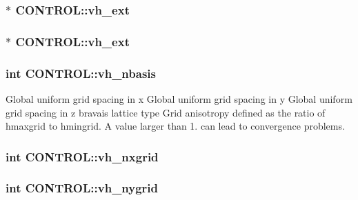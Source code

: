 \hypertarget{struct_c_o_n_t_r_o_l_a5b7c1f58a040c4d04103c8169757b896}{
\subsubsection[{vh\-\_\-ext}]{ $\ast$ C\-O\-N\-T\-R\-O\-L\-::vh\-\_\-ext}}\label{struct_c_o_n_t_r_o_l_a5b7c1f58a040c4d04103c8169757b896}
\hypertarget{struct_c_o_n_t_r_o_l_aba2213397b38451c01fe8e0325ebecb1}{
\subsubsection[{vh\-\_\-ext}]{$\ast$ C\-O\-N\-T\-R\-O\-L\-::vh\-\_\-ext}}\label{struct_c_o_n_t_r_o_l_aba2213397b38451c01fe8e0325ebecb1}
\hypertarget{struct_c_o_n_t_r_o_l_a3f8de26c496463e31095dc178aa7e8ab}{
\subsubsection[{vh\-\_\-nbasis}]{\setlength{\rightskip}{0pt plus 5cm}int C\-O\-N\-T\-R\-O\-L\-::vh\-\_\-nbasis}}\label{struct_c_o_n_t_r_o_l_a3f8de26c496463e31095dc178aa7e8ab}
Global uniform grid spacing in x Global uniform grid spacing in y Global uniform grid spacing in z bravais lattice type Grid anisotropy defined as the ratio of hmaxgrid to hmingrid. A value larger than 1. can lead to convergence problems. \hypertarget{struct_c_o_n_t_r_o_l_a886278a472868125c584cc39ade52c15}{
\subsubsection[{vh\-\_\-nxgrid}]{\setlength{\rightskip}{0pt plus 5cm}int C\-O\-N\-T\-R\-O\-L\-::vh\-\_\-nxgrid}}\label{struct_c_o_n_t_r_o_l_a886278a472868125c584cc39ade52c15}
\hypertarget{struct_c_o_n_t_r_o_l_add980bcd6b018fa6b2649c166af8ca0f}{
\subsubsection[{vh\-\_\-nygrid}]{\setlength{\rightskip}{0pt plus 5cm}int C\-O\-N\-T\-R\-O\-L\-::vh\-\_\-nygrid}}\label{struct_c_o_n_t_r_o_l_add980bcd6b018fa6b2649c166af8ca0f}
